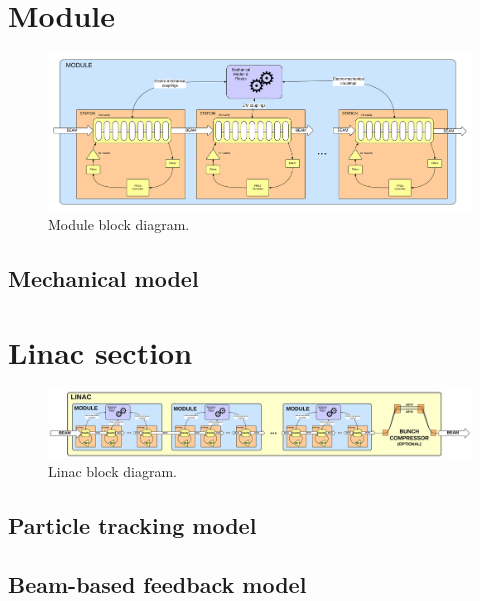 \documentclass[a4paper,12pt]{article}
\begin{document}
\section{Module}

\begin{figure}
\centering
\includegraphics[scale=0.08]{../figures/Module_block_diagram.png}
\caption{Module block diagram.}
\label{fig:Module_block_diagram}
\end{figure}


\subsection{Mechanical model}

\section{Linac section}

\begin{figure}
\centering
\includegraphics[scale=0.115]{../figures/Linac_block_diagram.png}
\caption{Linac block diagram.}
\label{fig:Linac_block_diagram}
\end{figure}

\subsection{Particle tracking model}



\subsection{Beam-based feedback model}
\end{document}
